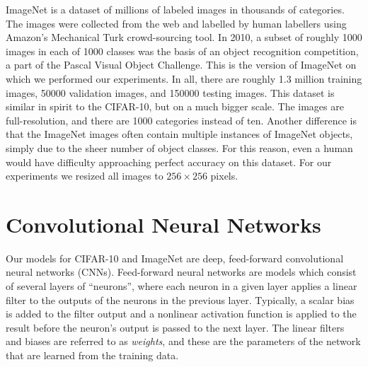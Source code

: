 \documentclass[12pt]{article}
\begin{document}
ImageNet is a dataset of millions of labeled images in thousands of
categories. The images were collected from the web and labelled by
human labellers using Amazon's Mechanical Turk crowd-sourcing tool.
In 2010, a subset of roughly 1000 images in each of 1000 classes was
the basis of an object recognition competition, a part of the Pascal
Visual Object Challenge. This is the version of ImageNet on which
we performed our experiments. In all, there are roughly 1.3 million
training images, 50000 validation images, and 150000 testing images.
This dataset is similar in spirit to the CIFAR-10, but on a much bigger
scale. The images are full-resolution, and there are 1000 categories
instead of ten. Another difference is that the ImageNet images often
contain multiple instances of ImageNet objects, simply due to the
sheer number of object classes. For this reason, even a human would
have difficulty approaching perfect accuracy on this dataset. For
our experiments we resized all images to $256\times256$ pixels.

\section{Convolutional Neural Networks}

Our models for CIFAR-10 and ImageNet are deep, feed-forward convolutional
neural networks (CNNs). Feed-forward neural networks are models which
consist of several layers of {}``neurons'', where each neuron in
a given layer applies a linear filter to the outputs of the neurons
in the previous layer. Typically, a scalar bias is added to the filter
output and a nonlinear activation function is applied to the result
before the neuron's output is passed to the next layer. The linear
filters and biases are referred to as \emph{weights}, and these are
the parameters of the network that are learned from the training data.
\end{document}
